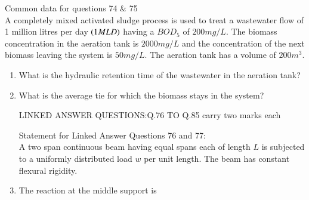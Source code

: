 \documentclass[journal]{IEEEtran}
\begin{document}
Common data for questions 74 \& 75 \\
A completely mixed activated sludge process is used to treat a wastewater flow of 1 million litres per day $\left(1 MLD\right)$ having a $BOD_5$ of $200 mg/L$. The biomass concentration in the aeration tank is $2000 mg/L$ and the concentration of the next biomass leaving the system is $50 mg/L$. The aeration tank has a volume of $200 m^3$.
\begin{enumerate}[start=74]
\item %
What is the hydraulic retention time of the wastewater in the aeration tank?
\begin{enumerate}
\end{enumerate}
\item %
What is the average tie for which the biomass stays in the system?
\begin{enumerate}
\end{enumerate}
\begin{center}
    LINKED ANSWER QUESTIONS:Q.76 TO Q.85 carry two marks each
\end{center} 
Statement for Linked Answer Questions 76 and 77:\\
A two span continuous beam having equal spans each of length $L$ is subjected  to a uniformly distributed load $w$ per unit length. The beam has constant flexural rigidity.
\item %
The reaction at the middle support is 
\begin{enumerate}
\end{enumerate}

\end{enumerate}
\end{document}
